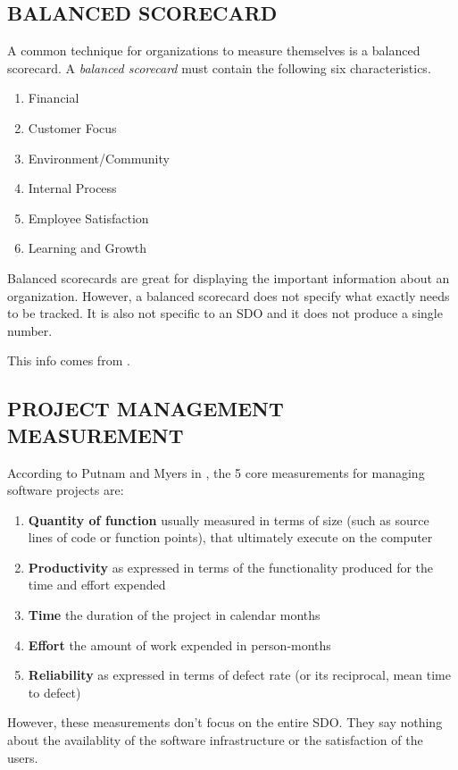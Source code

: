 \documentclass[SDSUThesis.tex]{subfiles}
\begin{document}
    \subsection{BALANCED SCORECARD}
    
        A common technique for organizations to measure themselves is a balanced scorecard. \cite{kaplan1992}
        A \textit{balanced scorecard} must contain the following six
        characteristics.
        \begin{enumerate}
          \item Financial 
          \item Customer Focus
          \item Environment/Community
          \item Internal Process
          \item Employee Satisfaction
          \item Learning and Growth
        \end{enumerate}
        
        Balanced scorecards are great for displaying the important information about
        an organization.  However, a balanced scorecard does not specify what
        exactly needs to be tracked.  It is also not specific to an SDO and 
        it does not produce a single number.
        
        This info comes from \cite{parmenter2010}.

    \subsection{PROJECT MANAGEMENT MEASUREMENT}
    According to Putnam and Myers in \cite{Putnam2013}, the 5 core measurements for managing software
    projects are:
    
    \begin{enumerate}
        \item \textbf{Quantity of function} usually measured in terms of size (such as source lines of code or function points), that ultimately execute on the computer
        \item \textbf{Productivity} as expressed in terms of the functionality produced for the time and effort expended
        \item \textbf{Time} the duration of the project in calendar months
        \item \textbf{Effort} the amount of work expended in person-months
        \item \textbf{Reliability} as expressed in terms of defect rate (or its reciprocal, mean time to defect)
    \end{enumerate}
    However, these measurements don't focus on the entire SDO. They say nothing about the availablity of the software infrastructure or the satisfaction of the users.
    
\end{document}
